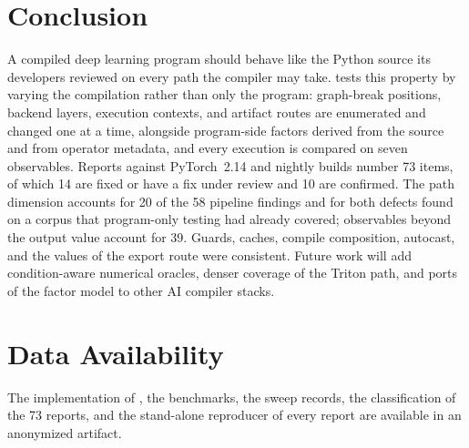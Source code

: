 \section{Conclusion}
\label{sec:conclusion}

A compiled deep learning program should behave like the Python source its developers reviewed on every path
the compiler may take. \tool tests this property by varying the compilation rather than only
the program: graph-break positions, backend layers, execution contexts, and artifact routes are enumerated
and changed one at a time, alongside program-side factors derived from the source and from operator metadata,
and every execution is compared on seven observables. Reports against PyTorch~2.14 and nightly builds number 73 items, of which 14 are fixed or have a fix under review and 10 are confirmed. The path
dimension accounts for 20 of the 58 pipeline findings and for both defects found on a corpus that program-only
testing had already covered; observables beyond the output value account for 39. Guards, caches, compile composition,
autocast, and the values of the export route were consistent. Future work will add condition-aware numerical
oracles, denser coverage of the Triton path, and ports of the factor model to other AI compiler stacks.

\section*{Data Availability}
The implementation of \tool, the benchmarks, the sweep records, the classification of the 73 reports, and the
stand-alone reproducer of every report are available in an anonymized artifact.
